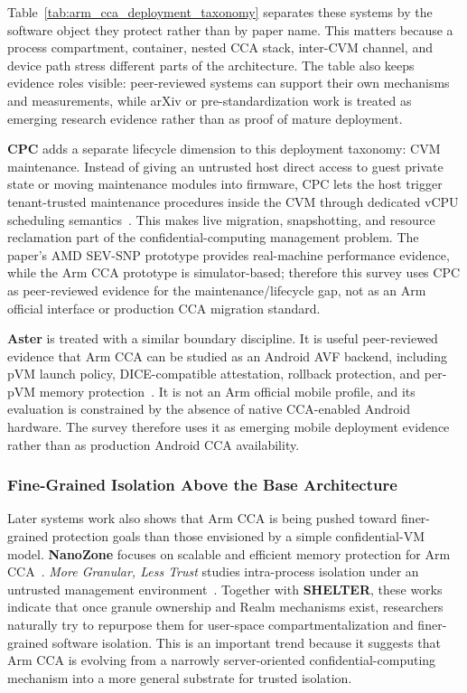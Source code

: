 Table~\ref{tab:arm_cca_deployment_taxonomy} separates these systems by the
software object they protect rather than by paper name. This matters because a
process compartment, container, nested CCA stack, inter-CVM channel, and device
path stress different parts of the architecture. The table also keeps evidence
roles visible: peer-reviewed systems can support their own mechanisms and
measurements, while arXiv or pre-standardization work is treated as emerging
research evidence rather than as proof of mature deployment.

\textbf{CPC} adds a separate lifecycle dimension to this deployment taxonomy:
CVM maintenance. Instead of giving an untrusted host direct access to guest
private state or moving maintenance modules into firmware, CPC lets the host
trigger tenant-trusted maintenance procedures inside the CVM through dedicated
vCPU scheduling semantics~\cite{chen2024cpc}. This makes live migration,
snapshotting, and resource reclamation part of the confidential-computing
management problem. The paper's AMD SEV-SNP prototype provides real-machine
performance evidence, while the Arm CCA prototype is simulator-based; therefore
this survey uses CPC as peer-reviewed evidence for the maintenance/lifecycle
gap, not as an Arm official interface or production CCA migration standard.

\textbf{Aster} is treated with a similar boundary discipline. It is useful
peer-reviewed evidence that Arm CCA can be studied as an Android AVF backend,
including pVM launch policy, DICE-compatible attestation, rollback protection,
and per-pVM memory protection~\cite{kuhne2026aster,tcg_dice_2018}. It is not an Arm official
mobile profile, and its evaluation is constrained by the absence of native
CCA-enabled Android hardware. The survey therefore uses it as emerging mobile
deployment evidence rather than as production Android CCA availability.

\subsubsection{Fine-Grained Isolation Above the Base Architecture}

Later systems work also shows that Arm CCA is being pushed toward finer-grained protection goals than those envisioned by a simple confidential-VM model. \textbf{NanoZone} focuses on scalable and efficient memory protection for Arm CCA~\cite{liu2025nanozone}. \textit{More Granular, Less Trust} studies intra-process isolation under an untrusted management environment~\cite{liu2025lesstrust}. Together with \textbf{SHELTER}, these works indicate that once granule ownership and Realm mechanisms exist, researchers naturally try to repurpose them for user-space compartmentalization and finer-grained software isolation. This is an important trend because it suggests that Arm CCA is evolving from a narrowly server-oriented confidential-computing mechanism into a more general substrate for trusted isolation.

